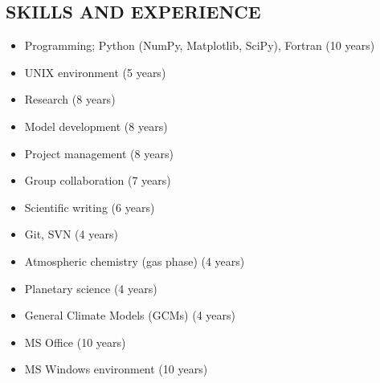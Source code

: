 \documentclass[letter, margin, 10pt]{res} %
\begin{document}
\begin{resume}

 


\section{SKILLS AND EXPERIENCE}

\begin{itemize}[noitemsep,topsep=0pt,parsep=0pt,partopsep=0pt]
\item Programming; Python (NumPy, Matplotlib, SciPy), Fortran \hfill (10 years)
\item UNIX environment \hfill(5 years)
\item Research \hfill(8 years)
\item Model development \hfill(8 years)
\item Project management \hfill(8 years)
\item Group collaboration \hfill(7 years)
\item Scientific writing \hfill(6 years)
\item Git, SVN \hfill (4 years)
\item Atmospheric chemistry (gas phase) \hfill (4 years)
\item Planetary science \hfill (4 years)
\item General Climate Models (GCMs) \hfill (4 years)
\item MS Office \hfill(10 years)
\item MS Windows environment \hfill (10 years)
\end{itemize}


\end{resume}
\end{document}
